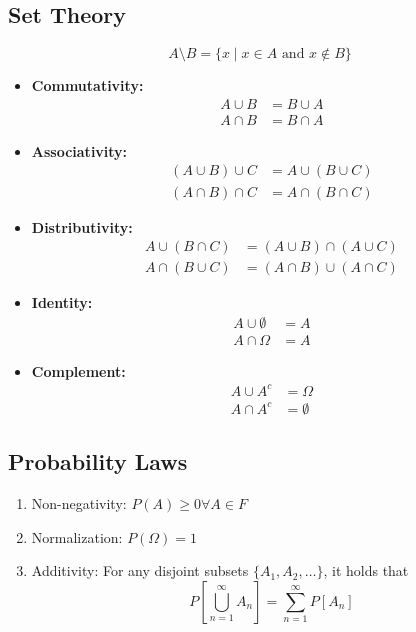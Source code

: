 \documentclass[nobib]{tufte-handout}
\begin{document}
\subsection{Set Theory}
\begin{equation}
    A \setminus B = \{ x \mid x \in A \text{ and } x \notin B \}
\end{equation}
\begin{itemize}
    \item \textbf{Commutativity:}
          \begin{align}
              A \cup B & = B \cup A \\
              A \cap B & = B \cap A
          \end{align}
    \item \textbf{Associativity:}
          \begin{align}
              (A \cup B) \cup C & = A \cup (B \cup C) \\
              (A \cap B) \cap C & = A \cap (B \cap C)
          \end{align}
    \item \textbf{Distributivity:}
          \begin{align}
              A \cup (B \cap C) & = (A \cup B) \cap (A \cup C) \\
              A \cap (B \cup C) & = (A \cap B) \cup (A \cap C)
          \end{align}
    \item \textbf{Identity:}
          \begin{align}
              A \cup \emptyset & = A \\
              A \cap \Omega    & = A
          \end{align}
    \item \textbf{Complement:}
          \begin{align}
              A \cup A^c & = \Omega    \\
              A \cap A^c & = \emptyset
          \end{align}
\end{itemize}

\subsection{Probability Laws}
\begin{enumerate}
    \item Non-negativity: $P(A) \geq 0 \forall A \in F$
    \item Normalization: $P(\Omega) = 1$
    \item Additivity: For any disjoint subsets $\{A_1, A_2, \dots\}$,
          it holds that
          \[P\left[\bigcup_{n=1}^{\infty}A_n\right] = \sum_{n=1}^{\infty}P\left[A_n\right]\]
\end{enumerate}
\end{document}
